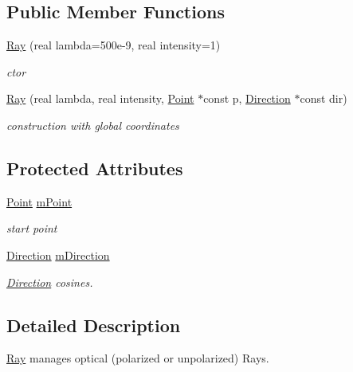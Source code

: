 \subsection*{Public Member Functions}
\begin{DoxyCompactItemize}
\item 
\hyperlink{classRay_abe7c9d6bfd243e256a5a69f5ab9ade39}{Ray} (real lambda=500e-\/9, real intensity=1)
\begin{DoxyCompactList}\small\item\em ctor \end{DoxyCompactList}\item 
\hyperlink{classRay_a248f18e16b380a3518608f23c7f3f82f}{Ray} (real lambda, real intensity, \hyperlink{classPoint}{Point} $\ast$const p, \hyperlink{classDirection}{Direction} $\ast$const dir)
\begin{DoxyCompactList}\small\item\em construction with global coordinates \end{DoxyCompactList}\end{DoxyCompactItemize}
\subsection*{Protected Attributes}
\begin{DoxyCompactItemize}
\item 
\hyperlink{classPoint}{Point} \hyperlink{classRay_a9665b2e2fccaffdcc4c7b682d578153b}{m\+Point}\hypertarget{classRay_a9665b2e2fccaffdcc4c7b682d578153b}{}\label{classRay_a9665b2e2fccaffdcc4c7b682d578153b}

\begin{DoxyCompactList}\small\item\em start point \end{DoxyCompactList}\item 
\hyperlink{classDirection}{Direction} \hyperlink{classRay_aebcf4d0d29d676055973101739e2261b}{m\+Direction}\hypertarget{classRay_aebcf4d0d29d676055973101739e2261b}{}\label{classRay_aebcf4d0d29d676055973101739e2261b}

\begin{DoxyCompactList}\small\item\em \hyperlink{classDirection}{Direction} cosines. \end{DoxyCompactList}\end{DoxyCompactItemize}


\subsection{Detailed Description}
\hyperlink{classRay}{Ray} manages optical (polarized or unpolarized) Rays. 

